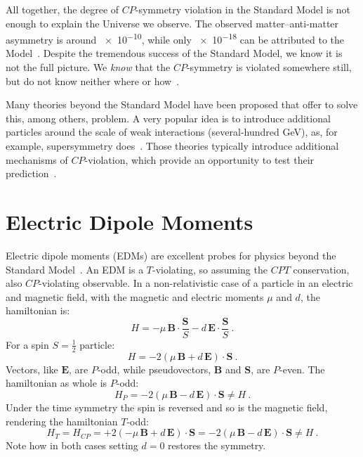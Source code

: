 All together, the degree of $CP$-symmetry violation in the Standard Model is not enough to explain the Universe we observe. The observed matter--anti-matter asymmetry is around \num{e-10}, while only \num{e-18} can be attributed to the Model~\cite{Riotto1999}. Despite the tremendous success of the Standard Model, we know it is not the full picture. We \emph{know} that the $CP$-symmetry is violated somewhere still, but do not know neither where or how~\cite{Pospelov2005}.%

Many theories beyond the Standard Model have been proposed that offer to solve this, among others, problem. A very popular idea is to introduce additional particles around the scale of weak interactions (several-hundred GeV), as, for example, supersymmetry does~\cite{Supersymmetry}. Those theories typically introduce additional mechanisms of $CP$-violation, which provide an opportunity to test their prediction~\cite{Ellis1989}.



\section{Electric Dipole Moments}
Electric dipole moments (EDMs) are excellent probes for physics beyond the Standard Model~\cite{Pospelov2005}. An EDM is a $T$-violating, so assuming the $CPT$ conservation, also $CP$-violating observable. In a non-relativistic case of a particle in an electric and magnetic field, with the magnetic and electric moments $\mu$ and $d$, the hamiltonian is:
\begin{equation}
  H = - \mu \, \bm{B} \cdot \frac{\bm{S}}{S} - d \, \bm{E} \cdot \frac{\bm{S}}{S} \ .
\end{equation}
For a spin $S = \tfrac{1}{2}$ particle:
\begin{equation}
  H = - 2 \left( \mu \, \bm{B} + d \, \bm{E} \right ) \cdot \bm{S} \ .
\end{equation}
Vectors, like $\bm{E}$, are $P$-odd, while pseudovectors, $\bm{B}$ and $\bm{S}$, are $P$-even. The hamiltonian as whole is $P$-odd:
\begin{equation}
  H_P = - 2 \left( \mu \, \bm{B} - d \, \bm{E} \right ) \cdot \bm{S} \neq H \ .
\end{equation}
Under the time symmetry the spin is reversed and so is the magnetic field, rendering the hamiltonian $T$-odd:
\begin{equation}
  H_T = H_{CP} = + 2 \left( - \mu \, \bm{B} + d \, \bm{E} \right ) \cdot \bm{S} = - 2 \left( \mu \, \bm{B} - d \, \bm{E} \right ) \cdot \bm{S} \neq H \ .
\end{equation}
Note how in both cases setting $d = 0$ restores the symmetry.

